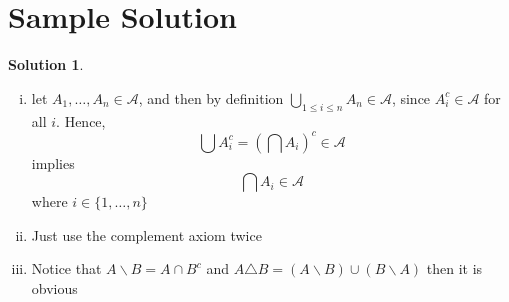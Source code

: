 \documentclass{article}
\theoremstyle{definition}
\newtheorem{solution}{Solution}
\begin{document}
\section*{Sample Solution}
\begin{solution}
	\begin{enumerate}[i)]
\item			let $A_1,\dots,A_n \in \mathscr{A}$, and then by definition $\bigcup_{1 \le i \le n} A_n \in \mathscr{A}$, since $A_i^c \in \mathscr{A} $ for all $i$. Hence,
	\begin{equation*}
		\bigcup{A_i^c} = (\bigcap{A_i})^c \in \mathscr{A}
	\end{equation*}
	implies 
	\begin{equation*}
		\bigcap{A_i} \in \mathscr{A}
	\end{equation*}
	where $i \in \{1,\dots,n\}$
\item Just use the complement axiom twice
\item Notice that $A\backslash B = A \cap B^c$ and $A \triangle B = (A \backslash B) \cup (B \backslash A)$ then it is obvious
	
\end{enumerate}	
\end{solution}
	
\end{document}
